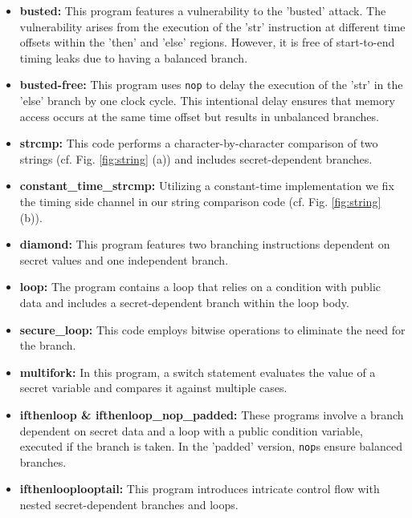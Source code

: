 \begin{itemize}
%
    \item \textbf{busted:} This program features a vulnerability to the 'busted' attack. The vulnerability arises from the execution of the 'str' instruction at different time offsets within the 'then' and 'else' regions. However, it is free of start-to-end timing leaks due to having a balanced branch.
%
    \item \textbf{busted-free:} This program uses \texttt{nop} to
delay the execution of the 'str' in the 'else' branch by one
clock cycle. This intentional delay ensures that memory access occurs at
the same time offset but results in unbalanced branches.
%
    \item \textbf{strcmp:} This code performs a character-by-character
comparison of two strings (cf. Fig. \ref{fig:string} (a)) and includes secret-dependent branches.
%
    \item \textbf{constant\_time\_strcmp:} Utilizing a constant-time
implementation we fix the timing side channel in our string comparison code (cf. Fig. \ref{fig:string} (b)).
%
    \item \textbf{diamond:} This program features two branching instructions dependent on secret values and one independent branch.
%
    \item \textbf{loop:} The program contains a loop that relies on a condition with public data and includes a secret-dependent branch within the loop body. 
%    
    \item \textbf{secure\_loop:} This code employs bitwise operations to
eliminate the need for the branch.
%    
    \item \textbf{multifork:} In this program, a switch statement evaluates the value of a secret variable and compares it against multiple cases. 
    
    \item \textbf{ifthenloop \& ifthenloop\_nop\_padded:} These programs
involve a branch dependent on secret data and a loop with a public
condition variable, executed if the branch is taken. In the
'padded' version, \texttt{nop}s ensure balanced branches.  
%    
    \item \textbf{ifthenlooplooptail:} This program introduces intricate
control flow with nested
secret-dependent branches and loops.
%
\end{itemize}


